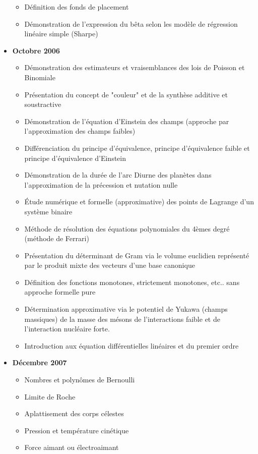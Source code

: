 \documentclass[12pt,a4paper,twoside,openright]{report}
\theoremstyle{definition}
\theoremstyle{itexmp}
\numberwithin{equation}{section}
\begin{document}
\begin{itemize}
\begin{itemize}[noitemsep]
				\item Définition des fonds de placement
				\item Démonstration de l'expression du bêta selon les modèle de régression linéaire simple (Sharpe)		
			\end{itemize}
		\item \textbf{Octobre 2006}
			\begin{itemize}[noitemsep]
				\item Démonstration des estimateurs et vraisemblances des lois de Poisson et Binomiale
				\item Présentation du concept de "couleur" et de la synthèse additive et soustractive
				\item Démonstration de l'équation d'Einstein des champs (approche par l'approximation des champs faibles)
				\item Différenciation du principe d'équivalence, principe d'équivalence faible et principe d'équivalence d'Einstein
				\item Démonstration de la durée de l'arc Diurne des planètes dans l'approximation de la précession et nutation nulle
				\item Étude numérique et formelle (approximative) des points de Lagrange d'un système binaire
				\item Méthode de résolution des équations polynomiales du 4èmes degré (méthode de Ferrari)
				\item Présentation du déterminant de Gram via le volume euclidien représenté par le produit mixte des vecteurs d'une base canonique
				\item Définition des fonctions monotones, strictement monotones, etc.. sans approche formelle pure
				\item Détermination approximative via le potentiel de Yukawa (champs massiques) de la masse des mésons de l'interactions faible et de l'interaction nucléaire forte.
				\item Introduction aux équation différentielles linéaires et du premier ordre
			\end{itemize}
		\item \textbf{Décembre 2007}
			\begin{itemize}[noitemsep]
				\item Nombres et polynômes de Bernoulli
				\item Limite de Roche
				\item Aplattisement des corps célestes
				\item Pression et température cinétique
				\item Force aimant ou électroaimant

\end{itemize}
\end{itemize}
\end{document}
